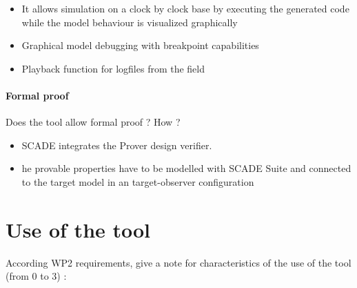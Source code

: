 \begin{itemize}
	\item It allows simulation on a clock by clock base by executing the generated code while the model behaviour is visualized graphically
	\item Graphical model debugging with breakpoint capabilities
	\item Playback function for logfiles from the field
\end{itemize}

\paragraph{Formal proof}
Does the tool allow formal proof ?  How ?

\begin{itemize}
	\item SCADE integrates the Prover design verifier. 
	\item he provable properties have to be modelled with SCADE Suite and connected to the target model in an target-observer configuration
\end{itemize}

\section{Use of the tool}


According WP2 requirements, give a note for characteristics of the use of the tool (from 0 to 3) :

